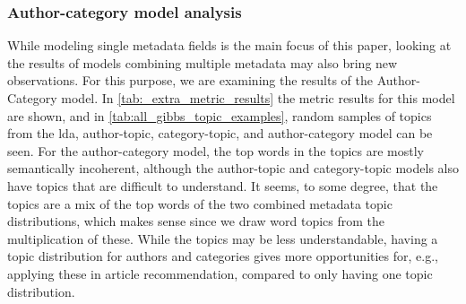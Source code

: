 \subsubsection*{Author-category model analysis}
While modeling single metadata fields is the main focus of this paper, looking at the results of models combining multiple metadata may also bring new observations.
For this purpose, we are examining the results of the Author-Category model.
In \autoref{tab:_extra_metric_results} the metric results for this model are shown, and in \autoref{tab:all_gibbs_topic_examples}, random samples of topics from the \gls{lda}, author-topic, category-topic, and author-category model can be seen.
For the author-category model, the top words in the topics are mostly semantically incoherent, although the author-topic and category-topic models also have topics that are difficult to understand.
It seems, to some degree, that the topics are a mix of the top words of the two combined metadata topic distributions, which makes sense since we draw word topics from the multiplication of these.
While the topics may be less understandable, having a topic distribution for authors and categories gives more opportunities for, e.g., applying these in article recommendation, compared to only having one topic distribution.
